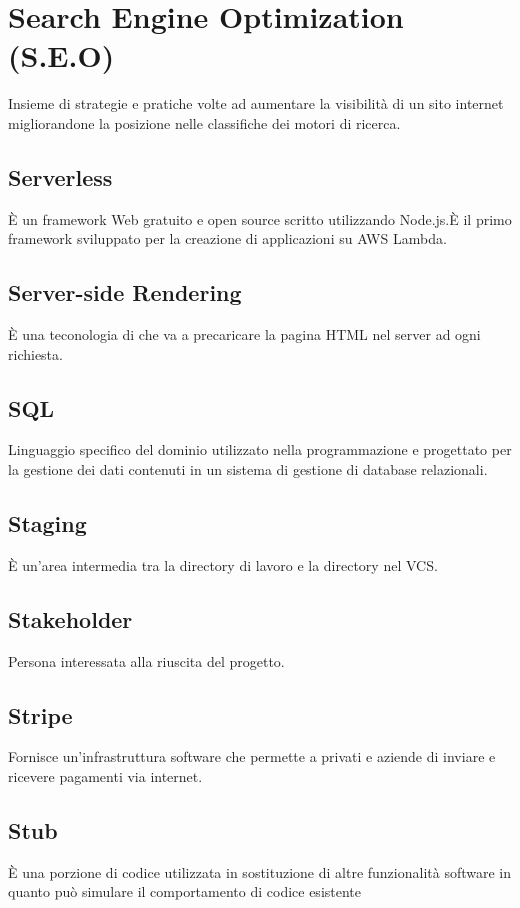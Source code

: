 \section{}
\section*{Search Engine Optimization (S.E.O)} Insieme di strategie e pratiche volte ad aumentare la visibilità di un sito internet migliorandone la posizione nelle classifiche dei motori di ricerca.
\subsection*{Serverless} È un framework Web gratuito e open source scritto utilizzando Node.js.È il primo framework sviluppato
per la creazione di applicazioni su AWS Lambda.

\subsection*{Server-side Rendering} È una teconologia di che va a precaricare la pagina HTML nel server ad ogni richiesta.

\subsection*{SQL} Linguaggio specifico del dominio utilizzato nella programmazione e progettato per la gestione dei dati
contenuti in un sistema di gestione di database relazionali.

\subsection*{Staging} È un'area intermedia tra la directory di lavoro e la directory nel VCS.

\subsection*{Stakeholder} Persona interessata alla riuscita del progetto.

\subsection*{Stripe} Fornisce un'infrastruttura software che permette a privati e aziende di inviare e ricevere pagamenti via internet.

\subsection*{Stub} È una porzione di codice utilizzata in sostituzione di altre funzionalità software in quanto può simulare il comportamento di codice esistente
\newpage